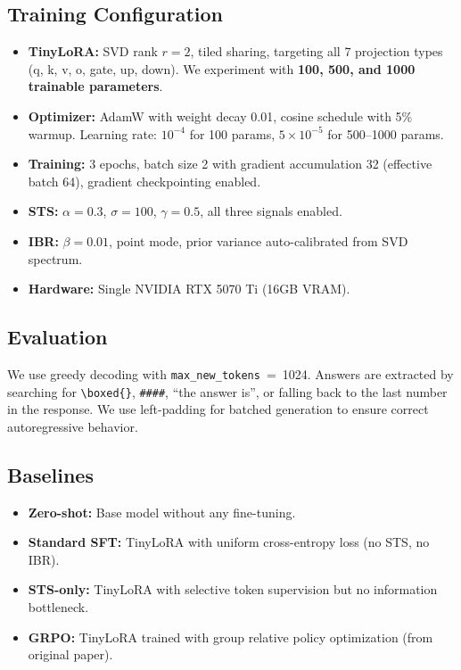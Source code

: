 \documentclass{article}
\begin{document}
\subsection{Training Configuration}

\begin{itemize}[leftmargin=*]
  \item \textbf{TinyLoRA:} SVD rank $r = 2$, tiled sharing, targeting all 7 projection types (q, k, v, o, gate, up, down). We experiment with \textbf{100, 500, and 1000 trainable parameters}.
  \item \textbf{Optimizer:} AdamW with weight decay 0.01, cosine schedule with 5\% warmup. Learning rate: $10^{-4}$ for 100 params, $5 \times 10^{-5}$ for 500--1000 params.
  \item \textbf{Training:} 3 epochs, batch size 2 with gradient accumulation 32 (effective batch 64), gradient checkpointing enabled.
  \item \textbf{STS:} $\alpha = 0.3$, $\sigma = 100$, $\gamma = 0.5$, all three signals enabled.
  \item \textbf{IBR:} $\beta = 0.01$, point mode, prior variance auto-calibrated from SVD spectrum.
  \item \textbf{Hardware:} Single NVIDIA RTX 5070 Ti (16GB VRAM).
\end{itemize}

\subsection{Evaluation}

We use greedy decoding with \texttt{max\_new\_tokens}~=~1024. Answers are extracted by searching for \verb|\boxed{}|, \verb|####|, ``the answer is'', or falling back to the last number in the response. We use left-padding for batched generation to ensure correct autoregressive behavior.

\subsection{Baselines}

\begin{itemize}[leftmargin=*]
  \item \textbf{Zero-shot:} Base model without any fine-tuning.
  \item \textbf{Standard SFT:} TinyLoRA with uniform cross-entropy loss (no STS, no IBR).
  \item \textbf{STS-only:} TinyLoRA with selective token supervision but no information bottleneck.
  \item \textbf{GRPO:} TinyLoRA trained with group relative policy optimization (from original paper).
\end{itemize}
\end{document}
